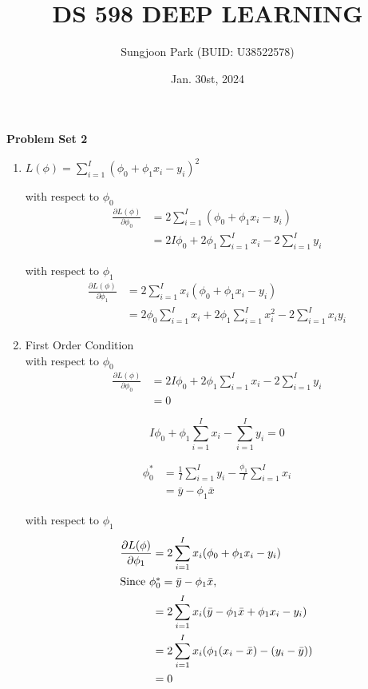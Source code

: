\documentclass[10pt]{article}
\title{DS 598 DEEP LEARNING}
\author{Sungjoon Park (BUID: U38522578)}
\date{Jan. 30st, 2024}
\begin{document}
\maketitle

\setlength{\parindent}{0cm}
\setlength{\parskip}{2mm}

\textbf{Problem Set 2}

\begin{enumerate}

\item

	$L(\phi)=\sum_{i=1}^{I}(\phi_0+\phi_1x_i-y_i)^2$
	
	with respect to $\phi_0$
	\begin{align*}
	\frac{\partial L(\phi)}{\partial \phi_0} &= 2\sum_{i=1}^{I}(\phi_0+\phi_1x_i-y_i) \\
	&= 2I\phi_0+2\phi_1\sum_{i=1}^Ix_i-2\sum_{i=1}^Iy_i
	\end{align*}
	
	with respect to $\phi_1$
	\begin{align*}
	\frac{\partial L(\phi)}{\partial \phi_1} &= 2\sum_{i=1}^{I}x_i(\phi_0+\phi_1x_i-y_i) \\
	&= 2\phi_0\sum_{i=1}^Ix_i+2\phi_1\sum_{i=1}^Ix_i^2-2\sum_{i=1}^Ix_iy_i
	\end{align*}



\item

	First Order Condition \\
	with respect to $\phi_0$
	\begin{align*}
	\frac{\partial L(\phi)}{\partial \phi_0} &= 2I\phi_0+2\phi_1\sum_{i=1}^Ix_i-2\sum_{i=1}^Iy_i \\
	&= 0
	\end{align*}
	
	$$I\phi_0+\phi_1\sum_{i=1}^Ix_i-\sum_{i=1}^Iy_i=0$$
	
	\begin{align*}
	\phi_0^* &= \frac{1}{I}\sum_{i=1}^Iy_i-\frac{\phi_1}{I}\sum_{i=1}^Ix_i \\
	&= \bar{y}-\phi_1\bar{x}
	\end{align*}
	
	with respect to $\phi_1$
	\begin{align*}
	\frac{\partial L(\phi)}{\partial \phi_1} &= 2\sum_{i=1}^{I}x_i(\phi_0+\phi_1x_i-y_i) \\
	\intertext{Since $\phi_0^*=\bar{y}-\phi_1\bar{x}$,}
	&= 2\sum_{i=1}^{I}x_i(\bar{y}-\phi_1\bar{x}+\phi_1x_i-y_i) \\
	&= 2\sum_{i=1}^{I}x_i(\phi_1(x_i-\bar{x})-(y_i-\bar{y})) \\
	&= 0
	\end{align*}
	

\end{enumerate}
\end{document}
